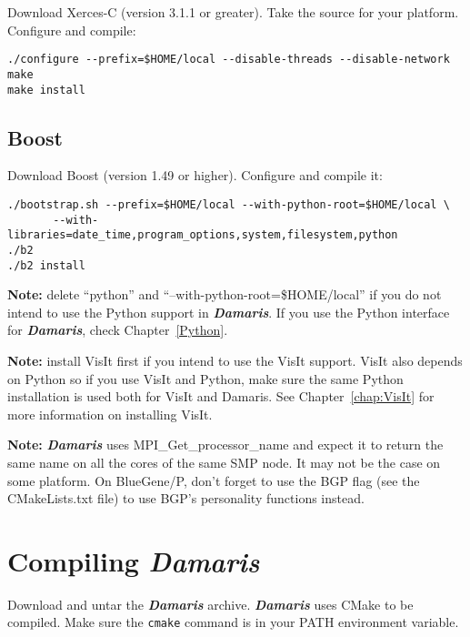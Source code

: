 \documentclass[11pt]{report}
\newcommand{\Damaris}{\emph{\textbf{Damaris}}}
\begin{document}
Download Xerces-C (version 3.1.1 or greater). Take the source for your platform.
Configure and compile:

\begin{verbatim}
./configure --prefix=$HOME/local --disable-threads --disable-network
make
make install
\end{verbatim}

\subsection{Boost}

Download Boost (version 1.49 or higher). Configure and compile it:

\begin{verbatim}
./bootstrap.sh --prefix=$HOME/local --with-python-root=$HOME/local \
       --with-libraries=date_time,program_options,system,filesystem,python 
./b2
./b2 install
\end{verbatim}

\noindent\textbf{Note:} delete ``python'' and ``--with-python-root=\$HOME/local'' if you do not intend 
to use the Python support in \Damaris{}. If you use the Python interface for \Damaris{}, check
Chapter~\ref{Python}.\newline

\noindent\textbf{Note:} install VisIt first if you intend to use the VisIt support. VisIt also depends on Python
so if you use VisIt and Python, make sure the same Python installation is used both for
VisIt and Damaris. See Chapter~\ref{chap:VisIt} for more information on installing VisIt.\newline

\noindent\textbf{Note:} \Damaris{} uses MPI\_Get\_processor\_name and expect it to return the same
name on all the cores of the same SMP node. It may not be the case on some platform. On BlueGene/P, don't forget to use the BGP flag (see the CMakeLists.txt file) to use BGP's personality
functions instead.

\section{Compiling \Damaris{}}

Download and untar the \Damaris{} archive. \Damaris{} uses CMake to be compiled.
Make sure the \texttt{cmake} command is in your PATH environment variable.
\end{document}
